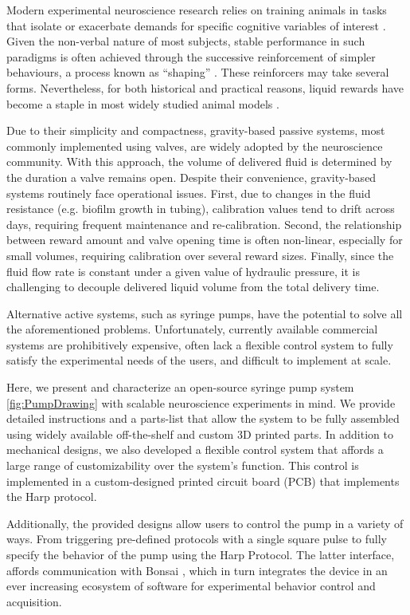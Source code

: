 Modern experimental neuroscience research relies on training animals in tasks that isolate or exacerbate demands for specific cognitive variables of interest \citep{Gomez-Marin2016}. Given the non-verbal nature of most subjects, stable performance in such paradigms is often achieved through the successive reinforcement of simpler behaviours, a process known as “shaping” \citep{Jones1939}. These reinforcers may take several forms. Nevertheless, for both historical and practical reasons, liquid rewards have become a staple in most widely studied animal models \citep{Guo2014}. 

Due to their simplicity and compactness, gravity-based passive systems, most commonly implemented using valves, are widely adopted by the neuroscience community. With this approach, the volume of delivered fluid is determined by the duration a valve remains open. Despite their convenience, gravity-based systems routinely face operational issues. First, due to changes in the fluid resistance (e.g. biofilm growth in tubing), calibration values tend to drift across days, requiring frequent maintenance and re-calibration. Second, the relationship between reward amount and valve opening time is often non-linear, especially for small volumes, requiring calibration over several reward sizes. Finally, since the fluid flow rate is constant under a given value of hydraulic pressure, it is challenging to decouple delivered liquid volume from the total delivery time.

Alternative active systems, such as syringe pumps, have the potential to solve all the aforementioned problems. Unfortunately, currently available commercial systems are prohibitively expensive, often lack a flexible control system to fully satisfy the experimental needs of the users, and difficult to implement at scale.

Here, we present and characterize an open-source syringe pump system \cref{fig:PumpDrawing} with scalable neuroscience experiments in mind. We provide detailed instructions and a parts-list that allow the system to be fully assembled using widely available off-the-shelf and custom 3D printed parts. 
In addition to mechanical designs, we also developed a flexible control system that affords a large range of customizability over the system's function. This control is implemented in a custom-designed printed circuit board (PCB) that implements the Harp protocol.

Additionally, the provided designs allow users to control the pump in a variety of ways. From triggering pre-defined protocols with a single square pulse to fully specify the behavior of the pump using the Harp Protocol. The latter interface, affords communication with Bonsai \citep{Lopes2015}, which in turn integrates the device in an ever increasing ecosystem of software for experimental behavior control and acquisition.

